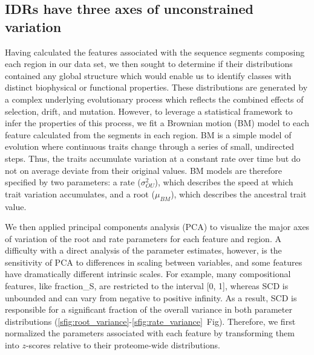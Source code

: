 \subsection{IDRs have three axes of unconstrained variation}
Having calculated the features associated with the sequence segments composing each region in our data set, we then sought to determine if their distributions contained any global structure which would enable us to identify classes with distinct biophysical or functional properties. These distributions are generated by a complex underlying evolutionary process which reflects the combined effects of selection, drift, and mutation. However, to leverage a statistical framework to infer the properties of this process, we fit a Brownian motion (BM) model to each feature calculated from the segments in each region. BM is a simple model of evolution where continuous traits change through a series of small, undirected steps. Thus, the traits accumulate variation at a constant rate over time but do not on average deviate from their original values. BM models are therefore specified by two parameters: a rate ($\sigma^2_{OU}$), which describes the speed at which trait variation accumulates, and a root ($\mu_{BM}$), which describes the ancestral trait value.

We then applied principal components analysis (PCA) to visualize the major axes of variation of the root and rate parameters for each feature and region. A difficulty with a direct analysis of the parameter estimates, however, is the sensitivity of PCA to differences in scaling between variables, and some features have dramatically different intrinsic scales. For example, many compositional features, like fraction\_S, are restricted to the interval [0, 1], whereas SCD is unbounded and can vary from negative to positive infinity. As a result, SCD is responsible for a significant fraction of the overall variance in both parameter distributions (\ref{sfig:root_variance}-\ref{sfig:rate_variance}~Fig). Therefore, we first normalized the parameters associated with each feature by transforming them into $z$-scores relative to their proteome-wide distributions.

